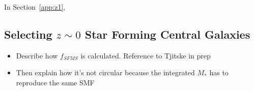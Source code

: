 \documentclass[12pt, letterpaper, preprint]{aastex}
\newcommand{\bitem}{\begin{itemize}}
\newcommand{\eitem}{\end{itemize}}
\begin{document}
In Section~\ref{app:z1}, 


\subsection{Selecting $z \sim 0$ Star Forming Central Galaxies}  
\bitem
\item Describe how $f_{SFMS}$ is calculated. Reference to Tjitske in prep 
\item Then explain how it's not circular because the integrated $M_*$ has to reproduce the same SMF
\eitem
\end{document}
